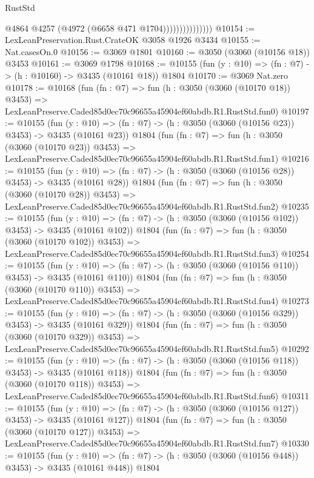 \begin{lexlean}{RustStd}
\begin{coremodule}
                              @4864
                              @4257
                              (@4972 (@6658 @471 @1704)))))))))))))))
@10154 := LexLeanPreservation.Rust.CrateOK @3058 @1926 @3434
@10155 := Nat.casesOn.{0}
@10156 := @3069 @1801
@10160 := @3050 (@3060 (@10156 @18)) @3453
@10161 := @3069 @1798
@10168 := @10155 (fun (y : @10) => (fn : @7) -> (h : @10160) -> @3435 (@10161 @18)) @1804
@10170 := @3069 Nat.zero
@10178 := @10168
    (fun (fn : @7) =>
    fun (h : @3050 (@3060 (@10170 @18)) @3453) =>
    LexLeanPreserve.Caded85d0ec70c96655a45904ef60abdb.R1.RustStd.fun0)
@10197 := @10155
    (fun (y : @10) => (fn : @7) -> (h : @3050 (@3060 (@10156 @23)) @3453) -> @3435 (@10161 @23))
    @1804
    (fun (fn : @7) =>
    fun (h : @3050 (@3060 (@10170 @23)) @3453) =>
    LexLeanPreserve.Caded85d0ec70c96655a45904ef60abdb.R1.RustStd.fun1)
@10216 := @10155
    (fun (y : @10) => (fn : @7) -> (h : @3050 (@3060 (@10156 @28)) @3453) -> @3435 (@10161 @28))
    @1804
    (fun (fn : @7) =>
    fun (h : @3050 (@3060 (@10170 @28)) @3453) =>
    LexLeanPreserve.Caded85d0ec70c96655a45904ef60abdb.R1.RustStd.fun2)
@10235 := @10155
    (fun (y : @10) => (fn : @7) -> (h : @3050 (@3060 (@10156 @102)) @3453) -> @3435 (@10161 @102))
    @1804
    (fun (fn : @7) =>
    fun (h : @3050 (@3060 (@10170 @102)) @3453) =>
    LexLeanPreserve.Caded85d0ec70c96655a45904ef60abdb.R1.RustStd.fun3)
@10254 := @10155
    (fun (y : @10) => (fn : @7) -> (h : @3050 (@3060 (@10156 @110)) @3453) -> @3435 (@10161 @110))
    @1804
    (fun (fn : @7) =>
    fun (h : @3050 (@3060 (@10170 @110)) @3453) =>
    LexLeanPreserve.Caded85d0ec70c96655a45904ef60abdb.R1.RustStd.fun4)
@10273 := @10155
    (fun (y : @10) => (fn : @7) -> (h : @3050 (@3060 (@10156 @329)) @3453) -> @3435 (@10161 @329))
    @1804
    (fun (fn : @7) =>
    fun (h : @3050 (@3060 (@10170 @329)) @3453) =>
    LexLeanPreserve.Caded85d0ec70c96655a45904ef60abdb.R1.RustStd.fun5)
@10292 := @10155
    (fun (y : @10) => (fn : @7) -> (h : @3050 (@3060 (@10156 @118)) @3453) -> @3435 (@10161 @118))
    @1804
    (fun (fn : @7) =>
    fun (h : @3050 (@3060 (@10170 @118)) @3453) =>
    LexLeanPreserve.Caded85d0ec70c96655a45904ef60abdb.R1.RustStd.fun6)
@10311 := @10155
    (fun (y : @10) => (fn : @7) -> (h : @3050 (@3060 (@10156 @127)) @3453) -> @3435 (@10161 @127))
    @1804
    (fun (fn : @7) =>
    fun (h : @3050 (@3060 (@10170 @127)) @3453) =>
    LexLeanPreserve.Caded85d0ec70c96655a45904ef60abdb.R1.RustStd.fun7)
@10330 := @10155
    (fun (y : @10) => (fn : @7) -> (h : @3050 (@3060 (@10156 @448)) @3453) -> @3435 (@10161 @448))
    @1804

\end{coremodule}
\end{lexlean}
